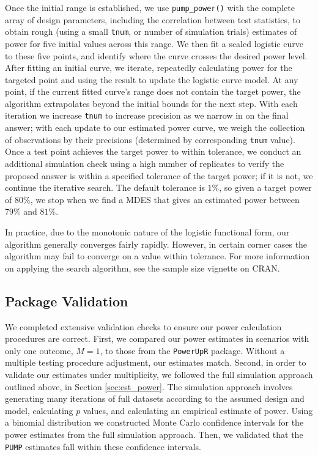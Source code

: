 \documentclass[
]{jss}
\begin{document}
Once the initial range is established, we use \texttt{pump\_power()}
with the complete array of design parameters, including the correlation
between test statistics, to obtain rough (using a small \texttt{tnum},
or number of simulation trials) estimates of power for five initial
values across this range. We then fit a scaled logistic curve to these
five points, and identify where the curve crosses the desired power
level. After fitting an initial curve, we iterate, repeatedly
calculating power for the targeted point and using the result to update
the logistic curve model. At any point, if the current fitted curve's
range does not contain the target power, the algorithm extrapolates
beyond the initial bounds for the next step. With each iteration we
increase \texttt{tnum} to increase precision as we narrow in on the
final answer; with each update to our estimated power curve, we weigh
the collection of observations by their precisions (determined by
corresponding \texttt{tnum} value). Once a test point achieves the
target power to within tolerance, we conduct an additional simulation
check using a high number of replicates to verify the proposed answer is
within a specified tolerance of the target power; if it is not, we
continue the iterative search. The default tolerance is \(1\%\), so
given a target power of \(80\%\), we stop when we find a MDES that gives
an estimated power between \(79\%\) and \(81\%\).

In practice, due to the monotonic nature of the logistic functional
form, our algorithm generally converges fairly rapidly. However, in
certain corner cases the algorithm may fail to converge on a value
within tolerance. For more information on applying the search algorithm,
see the sample size vignette on CRAN.

\subsection{Package Validation}

We completed extensive validation checks to ensure our power calculation
procedures are correct. First, we compared our power estimates in
scenarios with only one outcome, \(M = 1\), to those from the
\texttt{PowerUpR} package. Without a multiple testing procedure
adjustment, our estimates match. Second, in order to validate our
estimates under multiplicity, we followed the full simulation approach
outlined above, in Section \ref{sec:est_power}. The simulation approach
involves generating many iterations of full datasets according to the
assumed design and model, calculating \(p\) values, and calculating an
empirical estimate of power. Using a binomial distribution we
constructed Monte Carlo confidence intervals for the power estimates
from the full simulation approach. Then, we validated that the
\texttt{PUMP} estimates fall within these confidence intervals.
\end{document}
